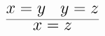 \documentclass[14pt,border=2pt]{standalone}
\begin{document}
        $$
        \LARGE 

\begin{prooftree}
\hypo{x = y}
\hypo{y = z}
\infer2{x = z}
\end{prooftree}
        $$
        
\end{document}
